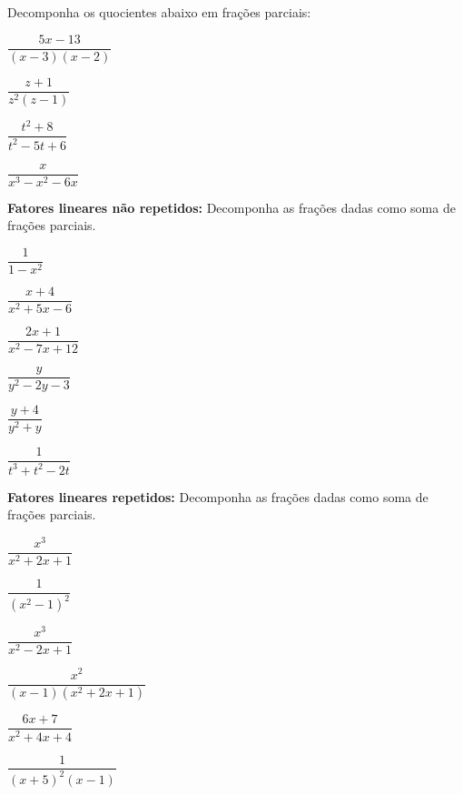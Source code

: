 \begin{secExercicios}

    \begin{exer}
    \item Decomponha os quocientes abaixo em frações parciais:
    \begin{enumerate}[a)]
    \begin{multicols}{2}
         \item $\dfrac{5x-13}{(x-3)(x-2)}$
         \item $\dfrac{z + 1}{z^2(z-1)}$
         \item $\dfrac{t^2 + 8}{t^2 - 5t + 6}$
         \item $\dfrac{x}{x^3 - x^2 - 6x}$
    \end{multicols}
    \end{enumerate}
    \end{exer}
    
    \begin{exer}
        \textbf{Fatores lineares não repetidos:} Decomponha as frações dadas como soma de frações parciais.
        \begin{enumerate}[a)]
        \begin{multicols}{2}
            \item $\dfrac{1}{1-x^2}$
            \item $\dfrac{x+4}{x^2 + 5x - 6}$
            \item $\dfrac{2x + 1}{x^2 - 7x + 12}$
            \item $\dfrac{y}{y^2 - 2y - 3}$
            \item $\dfrac{y + 4}{y^2 + y}$
            \item $\dfrac{1}{t^3 + t^2 - 2t}$
        \end{multicols}
        \end{enumerate}
    \end{exer}

    \begin{exer}
        \textbf{Fatores lineares repetidos:} Decomponha as frações dadas como soma de frações parciais.
        \begin{enumerate}[a)]
        \begin{multicols}{2}
            \item $\dfrac{x^3}{x^2 + 2x + 1}$
            \item $\dfrac{1}{(x^2 - 1)^2}$
            \item $\dfrac{x^3}{x^2 - 2x + 1}$
            \item $\dfrac{x^2}{(x-1)(x^2 + 2x + 1)}$
            \item $\dfrac{6x+7 }{x^2 + 4x + 4}$
            \item $\dfrac{1}{(x + 5)^2(x-1)}$
        \end{multicols}
        \end{enumerate}
    \end{exer}
    

\end{secExercicios}
